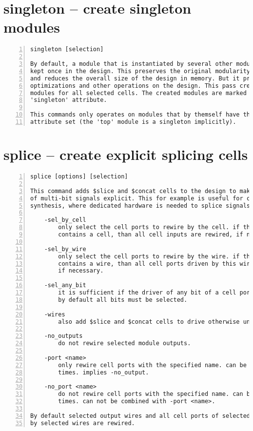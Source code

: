 \section{singleton -- create singleton modules}
\label{cmd:singleton}
\begin{lstlisting}[numbers=left,frame=single]
    singleton [selection]

By default, a module that is instantiated by several other modules is only
kept once in the design. This preserves the original modularity of the design
and reduces the overall size of the design in memory. But it prevents certain
optimizations and other operations on the design. This pass creates singleton
modules for all selected cells. The created modules are marked with the
'singleton' attribute.

This commands only operates on modules that by themself have the 'singleton'
attribute set (the 'top' module is a singleton implicitly).
\end{lstlisting}

\section{splice -- create explicit splicing cells}
\label{cmd:splice}
\begin{lstlisting}[numbers=left,frame=single]
    splice [options] [selection]

This command adds $slice and $concat cells to the design to make the splicing
of multi-bit signals explicit. This for example is useful for coarse grain
synthesis, where dedicated hardware is needed to splice signals.

    -sel_by_cell
        only select the cell ports to rewire by the cell. if the selection
        contains a cell, than all cell inputs are rewired, if necessary.

    -sel_by_wire
        only select the cell ports to rewire by the wire. if the selection
        contains a wire, than all cell ports driven by this wire are wired,
        if necessary.

    -sel_any_bit
        it is sufficient if the driver of any bit of a cell port is selected.
        by default all bits must be selected.

    -wires
        also add $slice and $concat cells to drive otherwise unused wires.

    -no_outputs
        do not rewire selected module outputs.

    -port <name>
        only rewire cell ports with the specified name. can be used multiple
        times. implies -no_output.

    -no_port <name>
        do not rewire cell ports with the specified name. can be used multiple
        times. can not be combined with -port <name>.

By default selected output wires and all cell ports of selected cells driven
by selected wires are rewired.
\end{lstlisting}

